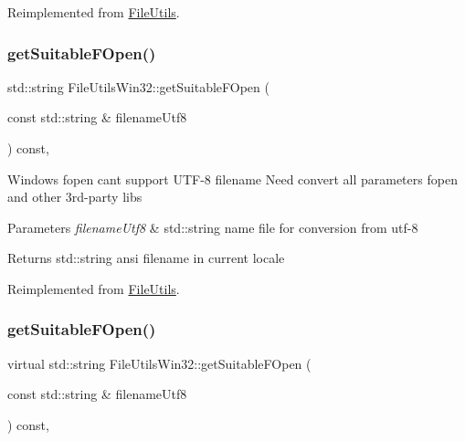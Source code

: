 Reimplemented from \hyperlink{classFileUtils_ae575880a693de746f1505be83c6b4bfa}{File\+Utils}.

\mbox{\label{classFileUtilsWin32_a39228d2480a9b1343516bb9f1abe06b1}} 
\subsubsection{\texorpdfstring{get\+Suitable\+F\+Open()}{getSuitableFOpen()}\hspace{0.1cm}{\footnotesize\ttfamily [1/2]}}
{\footnotesize\ttfamily std\+::string File\+Utils\+Win32\+::get\+Suitable\+F\+Open (\begin{DoxyParamCaption}\item[{const std\+::string \&}]{filename\+Utf8 }\end{DoxyParamCaption}) const\hspace{0.3cm}{\ttfamily [override]}, {\ttfamily [virtual]}}

Windows fopen can\textquotesingle{}t support U\+T\+F-\/8 filename Need convert all parameters fopen and other 3rd-\/party libs


\begin{DoxyParams}{Parameters}
{\em filename\+Utf8} & std\+::string name file for conversion from utf-\/8 \\
\hline
\end{DoxyParams}
\begin{DoxyReturn}{Returns}
std\+::string ansi filename in current locale 
\end{DoxyReturn}


Reimplemented from \hyperlink{classFileUtils_a318996e1e3cc1ff7463dea9159d7e7be}{File\+Utils}.

\mbox{\label{classFileUtilsWin32_a4e2aff9afbff7e4bac487f626186dac0}} 
\subsubsection{\texorpdfstring{get\+Suitable\+F\+Open()}{getSuitableFOpen()}\hspace{0.1cm}{\footnotesize\ttfamily [2/2]}}
{\footnotesize\ttfamily virtual std\+::string File\+Utils\+Win32\+::get\+Suitable\+F\+Open (\begin{DoxyParamCaption}\item[{const std\+::string \&}]{filename\+Utf8 }\end{DoxyParamCaption}) const\hspace{0.3cm}{\ttfamily [override]}, {\ttfamily [virtual]}}

